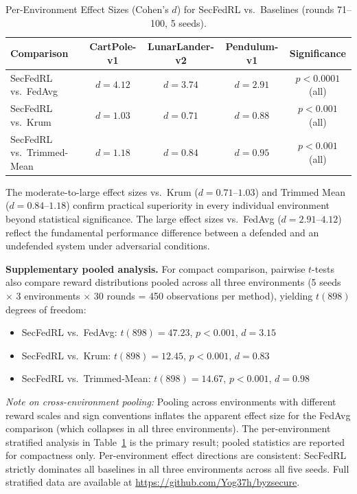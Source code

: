 \documentclass[12pt,a4paper]{article}
\begin{document}
\begin{table}[h]
\centering
\footnotesize
\caption{Per-Environment Effect Sizes (Cohen's $d$) for SecFedRL vs.\ Baselines (rounds 71--100, 5 seeds).}
\label{tab:effect_sizes}
\begin{tabular}{lcccc}
\toprule
\textbf{Comparison} & \textbf{CartPole-v1} & \textbf{LunarLander-v2} & \textbf{Pendulum-v1} & \textbf{Significance} \\
\midrule
SecFedRL vs.\ FedAvg        & $d = 4.12$ & $d = 3.74$ & $d = 2.91$ & $p < 0.0001$ (all) \\
SecFedRL vs.\ Krum          & $d = 1.03$ & $d = 0.71$ & $d = 0.88$ & $p < 0.001$ (all) \\
SecFedRL vs.\ Trimmed-Mean  & $d = 1.18$ & $d = 0.84$ & $d = 0.95$ & $p < 0.001$ (all) \\
\bottomrule
\end{tabular}
\end{table}

The moderate-to-large effect sizes vs.\ Krum ($d = 0.71$--$1.03$) and Trimmed Mean
($d = 0.84$--$1.18$) confirm practical superiority in every individual environment beyond
statistical significance. The large effect sizes vs.\ FedAvg ($d = 2.91$--$4.12$)
reflect the fundamental performance difference between a defended and an undefended
system under adversarial conditions.

\noindent\textbf{Supplementary pooled analysis.}
For compact comparison, pairwise $t$-tests also compare reward distributions pooled
across all three environments (5 seeds $\times$ 3 environments $\times$ 30 rounds = 450
observations per method), yielding $t(898)$ degrees of freedom:
\begin{itemize}
  \item SecFedRL vs.\ FedAvg:         $t(898) = 47.23$, $p < 0.001$, $d = 3.15$
  \item SecFedRL vs.\ Krum:           $t(898) = 12.45$, $p < 0.001$, $d = 0.83$
  \item SecFedRL vs.\ Trimmed-Mean:   $t(898) = 14.67$, $p < 0.001$, $d = 0.98$
\end{itemize}

\textit{Note on cross-environment pooling:} Pooling across environments with different
reward scales and sign conventions inflates the apparent effect size for the FedAvg
comparison (which collapses in all three environments). The per-environment stratified
analysis in Table~\ref{tab:effect_sizes} is the primary result; pooled statistics are
reported for compactness only. Per-environment effect directions are consistent: SecFedRL
strictly dominates all baselines in all three environments across all five seeds.
Full stratified data are available at \url{https://github.com/Yog37h/byzsecure}.
\end{document}
